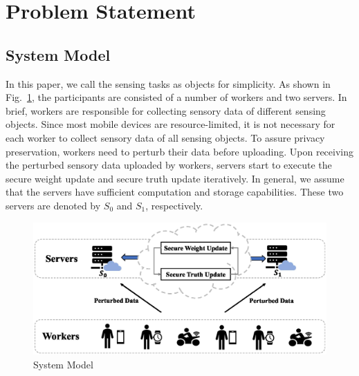 \documentclass[conference]{IEEEtran}
\begin{document}


\section{Problem Statement}\label{sec3}

\subsection{System Model}\label{sec3-A}
In this paper, we call the sensing tasks as objects for simplicity.
As shown in Fig.~\ref{fig:sysmodel}, the participants are consisted of a number of workers and two servers.
% 
In brief, workers are responsible for collecting sensory data of different sensing objects.
Since most mobile devices are resource-limited, it is not necessary for each worker to collect sensory data of all sensing objects.
To assure privacy preservation, workers need to perturb their data before uploading.
Upon receiving the perturbed sensory data uploaded by workers, servers start to execute the secure weight update and secure truth update iteratively.
In general, we assume that the servers have sufficient computation and storage capabilities.
These two servers are denoted by $S_0$ and $S_1$, respectively.


\begin{figure}[htbp]
  \centering 
  \includegraphics[width=0.96\linewidth]{figures/system_model.eps}
  \caption{System Model}
  \label{fig:sysmodel}
\end{figure}
\end{document}
